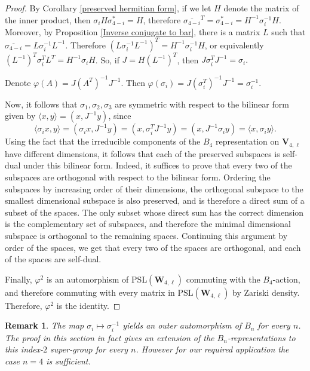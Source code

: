 \documentclass[letterpaper]{amsart}
\newtheorem{remark}[theorem]{Remark}
\begin{document}
\begin{proof}
By Corollary \ref{preserved hermitian form}, if we let $H$ denote the matrix of the inner product, then $\sigma_i H \sigma_{4-i}^\ast = H$, therefore $\overline{\sigma_{4-i}}^T = \sigma_{4-i}^\ast = H^{-1}\sigma_i^{-1}H$. Moreover, by Proposition \ref{Inverse conjugate to bar}, there is a matrix $L$ such that $\overline{\sigma_{4-i}} = L\sigma_i^{-1}L^{-1}$. Therefore $(L\sigma_i^{-1}L^{-1})^T = H^{-1}\sigma_i^{-1} H$, or equivalently $(L^{-1})^T\sigma_i^TL^T = H^{-1}\sigma_i H$. So, if $J = H(L^{-1})^T$, then $J \sigma_i^T J^{-1} = \sigma_i.$

Denote $\varphi(A) = J(A^T)^{-1}J^{-1}.$ Then $\varphi(\sigma_i) = J (\sigma_i^T)^{-1} J^{-1} = \sigma_i^{-1}.$

Now, it follows that $\sigma_1, \sigma_2, \sigma_3$ are symmetric with respect to the bilinear form given by $\langle x,y\rangle  = (x, J^{-1}y)$, since $$\langle\sigma_ix, y\rangle =(\sigma_ix, J^{-1}y) = (x, \sigma_i^TJ^{-1}y) = (x, J^{-1}\sigma_i y) = \langle x, \sigma_iy \rangle.$$Using the fact that the irreducible components of the $B_4$ representation on $\textbf{V}_{4, \ell}$ have different dimensions, it follows that each of the preserved subspaces is self-dual under this bilinear form. Indeed, it suffices to prove that every two of the subspaces are orthogonal with respect to the bilinear form. Ordering the subspaces by increasing order of their dimensions, the orthogonal subspace to the smallest dimensional subspace is also preserved, and is therefore a direct sum of a subset of the spaces. The only subset whose direct sum has the correct dimension is the complementary set of subspaces, and therefore the minimal dimensional subspace is orthogonal to the remaining spaces. Continuing this argument by order of the spaces, we get that every two of the spaces are orthogonal, and each of the spaces are self-dual.

Finally, $\varphi^2$ is an automorphism of $\mathrm{PSL}(\textbf{W}_{4,\ell})$ commuting with the $B_4$-action, and therefore commuting with every matrix in $\mathrm{PSL}(\textbf{W}_{4,\ell})$ by Zariski density. Therefore, $\varphi^2$ is the identity.
\end{proof}
\begin{remark}
    The map $\sigma_i \mapsto \sigma_i^{-1}$ yields an outer automorphism of $B_n$ for every $n$. The proof in this section in fact gives an extension of the $B_n$-representations to this index-$2$ super-group for every $n$. However for our required application the case $n = 4$ is sufficient.
\end{remark}
\end{document}
